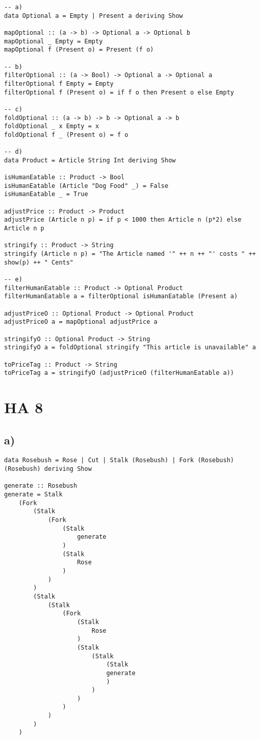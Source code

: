 \documentclass[a4paper]{article}
\begin{document}
\begin{lstlisting}
-- a)
data Optional a = Empty | Present a deriving Show

mapOptional :: (a -> b) -> Optional a -> Optional b
mapOptional _ Empty = Empty
mapOptional f (Present o) = Present (f o)

-- b)
filterOptional :: (a -> Bool) -> Optional a -> Optional a
filterOptional f Empty = Empty
filterOptional f (Present o) = if f o then Present o else Empty 

-- c)
foldOptional :: (a -> b) -> b -> Optional a -> b
foldOptional _ x Empty = x
foldOptional f _ (Present o) = f o

-- d)
data Product = Article String Int deriving Show

isHumanEatable :: Product -> Bool
isHumanEatable (Article "Dog Food" _) = False
isHumanEatable _ = True 

adjustPrice :: Product -> Product
adjustPrice (Article n p) = if p < 1000 then Article n (p*2) else Article n p

stringify :: Product -> String
stringify (Article n p) = "The Article named '" ++ n ++ "' costs " ++ show(p) ++ " Cents"

-- e)
filterHumanEatable :: Product -> Optional Product
filterHumanEatable a = filterOptional isHumanEatable (Present a)

adjustPriceO :: Optional Product -> Optional Product
adjustPriceO a = mapOptional adjustPrice a

stringifyO :: Optional Product -> String
stringifyO a = foldOptional stringify "This article is unavailable" a

toPriceTag :: Product -> String
toPriceTag a = stringifyO (adjustPriceO (filterHumanEatable a))
\end{lstlisting}

\pagebreak

\section*{ HA 8 }
\subsection*{a)}
\begin{lstlisting}
data Rosebush = Rose | Cut | Stalk (Rosebush) | Fork (Rosebush) (Rosebush) deriving Show

generate :: Rosebush
generate = Stalk
	(Fork
		(Stalk
			(Fork
				(Stalk
					generate
				)
				(Stalk
					Rose
				)
			)
		)
		(Stalk
			(Stalk
				(Fork
					(Stalk
						Rose
					)
					(Stalk
						(Stalk
							(Stalk
							generate
							)
						)
					)
				)
			)
		)		
	)
		
\end{lstlisting}
\end{document}
